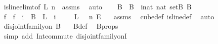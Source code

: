 \begin{isabellebody}
\ is{\isacharunderscore}{\kern0pt}line{\isacharunderscore}{\kern0pt}elim{\isacharunderscore}{\kern0pt}t{\isacharunderscore}{\kern0pt}{}{\isacharbrackleft}{\kern0pt}of\ L\ n\ {}{\isacharbrackright}{\kern0pt}\ assms\ \isamarkupfalse%
\ auto\isanewline
\ \ \isamarkupfalse%
\ B\ \ {\isachardoublequoteopen}B\ {\isasymequiv}\ {\isacharparenleft}{\kern0pt}{\isasymlambda}i{\isacharcolon}{\kern0pt}{\isacharcolon}{\kern0pt}nat{\isachardot}{\kern0pt}\ {\isacharbraceleft}{\kern0pt}{\isacharbraceright}{\kern0pt}{\isacharcolon}{\kern0pt}{\isacharcolon}{\kern0pt}nat\ set{\isacharparenright}{\kern0pt}{\isacharparenleft}{\kern0pt}{}{\isacharcolon}{\kern0pt}{\isacharequal}{\kern0pt}B\ {}{\isacharcolon}{\kern0pt}{\isacharequal}{\kern0pt}B\ \isanewline
\ \ \isamarkupfalse%
\ f\ \ {\isachardoublequoteopen}f\ {\isasymequiv}\ {\isacharparenleft}{\kern0pt}{\isasymlambda}i\ {\isasymin}\ B\ {}{\isachardot}{\kern0pt}\ L\ {}\ i{\isacharparenright}{\kern0pt}{\isachardoublequoteclose}\isanewline
\ \ \isamarkupfalse%
\ {\isacharasterisk}{\kern0pt}{\isacharcolon}{\kern0pt}\ {\isachardoublequoteopen}L\ {}\ {\isasymin}\ {\isacharbraceleft}{\kern0pt}{\isachardot}{\kern0pt}{\isachardot}{\kern0pt}{\isacharless}{\kern0pt}n{\isacharbraceright}{\kern0pt}\ {\isasymrightarrow}\isactrlsub E\ {\isacharbraceleft}{\kern0pt}{\isachardot}{\kern0pt}{\isachardot}{\kern0pt}{\isacharless}{\kern0pt}{}{\isacharbraceright}{\kern0pt}{\isachardoublequoteclose}\ \isamarkupfalse%
\ assms{\isacharparenleft}{\kern0pt}{}{\isacharparenright}{\kern0pt}\ \isamarkupfalse%
\ cube{\isacharunderscore}{\kern0pt}def\ is{\isacharunderscore}{\kern0pt}line{\isacharunderscore}{\kern0pt}def\ \isamarkupfalse%
\ auto\isanewline
\ \ \isamarkupfalse%
\ {\isachardoublequoteopen}disjoint{\isacharunderscore}{\kern0pt}family{\isacharunderscore}{\kern0pt}on\ B\ {\isacharbraceleft}{\kern0pt}{\isachardot}{\kern0pt}{\isachardot}{\kern0pt}{}{\isacharbraceright}{\kern0pt}{\isachardoublequoteclose}\ \isamarkupfalse%
\ B{\isacharunderscore}{\kern0pt}def\ \isamarkupfalse%
\ B{\isacharunderscore}{\kern0pt}props\ \isanewline
\ \ \ \ \isamarkupfalse%
\ {\isacharparenleft}{\kern0pt}simp\ add{\isacharcolon}{\kern0pt}\ Int{\isacharunderscore}{\kern0pt}commute\ disjoint{\isacharunderscore}{\kern0pt}family{\isacharunderscore}{\kern0pt}onI{\isacharparenright}{\kern0pt}\isanewline

\end{isabellebody}
